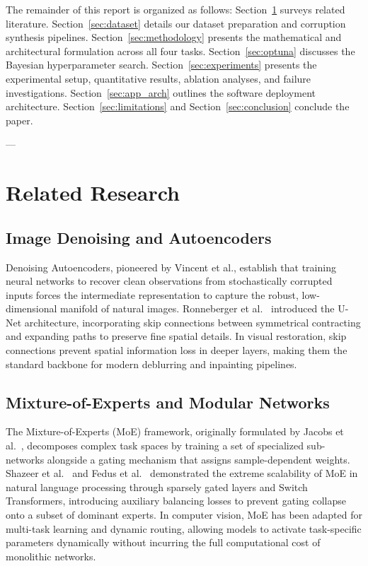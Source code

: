 \documentclass[journal,compsoc]{IEEEtran}
\begin{document}
The remainder of this report is organized as follows: Section~\ref{sec:related_work} surveys related literature. Section~\ref{sec:dataset} details our dataset preparation and corruption synthesis pipelines. Section~\ref{sec:methodology} presents the mathematical and architectural formulation across all four tasks. Section~\ref{sec:optuna} discusses the Bayesian hyperparameter search. Section~\ref{sec:experiments} presents the experimental setup, quantitative results, ablation analyses, and failure investigations. Section~\ref{sec:app_arch} outlines the software deployment architecture. Section~\ref{sec:limitations} and Section~\ref{sec:conclusion} conclude the paper.

---

\section{Related Research}
\label{sec:related_work}

\subsection{Image Denoising and Autoencoders}
Denoising Autoencoders, pioneered by Vincent et al., establish that training neural networks to recover clean observations from stochastically corrupted inputs forces the intermediate representation to capture the robust, low-dimensional manifold of natural images. Ronneberger et al.~\cite{ronneberger2015u} introduced the U-Net architecture, incorporating skip connections between symmetrical contracting and expanding paths to preserve fine spatial details. In visual restoration, skip connections prevent spatial information loss in deeper layers, making them the standard backbone for modern deblurring and inpainting pipelines.

\subsection{Mixture-of-Experts and Modular Networks}
The Mixture-of-Experts (MoE) framework, originally formulated by Jacobs et al.~\cite{jacobs1991adaptive}, decomposes complex task spaces by training a set of specialized sub-networks alongside a gating mechanism that assigns sample-dependent weights. Shazeer et al.~\cite{shazeer2017outrageously} and Fedus et al.~\cite{fedus2022switch} demonstrated the extreme scalability of MoE in natural language processing through sparsely gated layers and Switch Transformers, introducing auxiliary balancing losses to prevent gating collapse onto a subset of dominant experts. In computer vision, MoE has been adapted for multi-task learning and dynamic routing, allowing models to activate task-specific parameters dynamically without incurring the full computational cost of monolithic networks.
\end{document}
